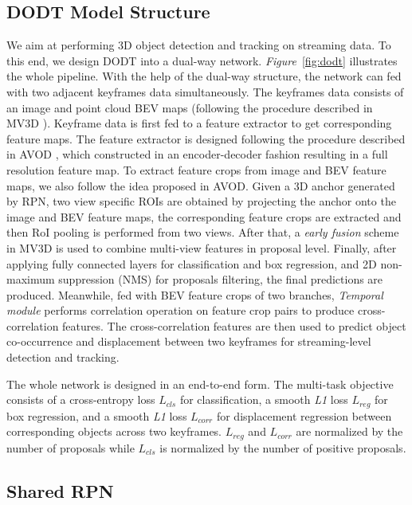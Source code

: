 \documentclass[a4paper, 10pt, conference]{ieeeconf}      %
\def\figurename{\emph{Figure}}
\begin{document}
\subsection{DODT Model Structure} 

We aim at performing 3D object detection and tracking on streaming data. To this end, we design DODT into a dual-way network. \figurename \, \ref{fig:dodt} illustrates the whole pipeline. With the help of the dual-way structure, the network can fed with two adjacent keyframes data simultaneously. The keyframes data consists of an image and point cloud BEV maps (following the procedure described in MV3D \cite{chen2017multi}). Keyframe data is first fed to a feature extractor to get corresponding feature maps. The feature extractor is designed following the procedure described in AVOD \cite{ku2018joint}, which constructed in an encoder-decoder fashion resulting in a full resolution feature map. To extract feature crops from image and BEV feature maps, we also follow the idea proposed in AVOD. Given a 3D anchor generated by RPN, two view specific ROIs are obtained by projecting the anchor onto the image and BEV feature maps, the corresponding feature crops are extracted and then RoI pooling is performed from two views. After that, a \textit{early fusion} scheme in MV3D \cite{chen2017multi} is used to combine multi-view features in proposal level. Finally, after applying fully connected layers for classification and box regression, and 2D non-maximum suppression (NMS) for proposals filtering, the final predictions are produced. Meanwhile, fed with BEV feature crops of two branches, \textit{Temporal module} performs correlation operation on feature crop pairs to produce cross-correlation features. The cross-correlation features are then used to predict object co-occurrence and displacement between two keyframes for streaming-level detection and tracking.

The whole network is designed in an end-to-end form. The multi-task objective consists of a cross-entropy loss $L_{cls}$ for classification, a smooth \textit{L1} loss $L_{reg}$ for box regression, and a smooth \textit{L1} loss $L_{corr}$ for displacement regression between corresponding objects across two keyframes. $L_{reg}$ and $L_{corr}$ are normalized by the number of proposals while $L_{cls}$ is normalized by the number of positive proposals.

\subsection{Shared RPN}
\end{document}

